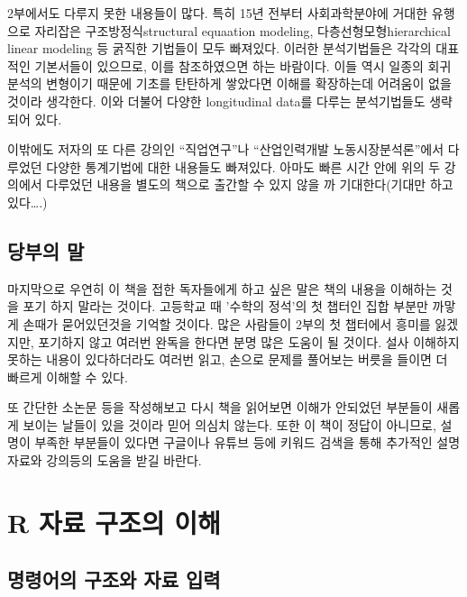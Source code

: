 \documentclass[
]{book}
\theoremstyle{definition}
\theoremstyle{definition}
\theoremstyle{definition}
\theoremstyle{definition}
\theoremstyle{remark}
\begin{document}
2부에서도 다루지 못한 내용들이 많다. 특히 15년 전부터 사회과학분야에 거대한 유행으로 자리잡은 구조방정식structural equaation modeling, 다층선형모형hierarchical linear modeling 등 굵직한 기법들이 모두 빠져있다. 이러한 분석기법들은 각각의 대표적인 기본서들이 있으므로, 이를 참조하였으면 하는 바람이다. 이들 역시 일종의 회귀분석의 변형이기 때문에 기초를 탄탄하게 쌓았다면 이해를 확장하는데 어려움이 없을 것이라 생각한다. 이와 더불어 다양한 longitudinal data를 다루는 분석기법들도 생략되어 있다.

이밖에도 저자의 또 다른 강의인 ``직업연구''나 ``산업인력개발 노동시장분석론''에서 다루었던 다양한 통계기법에 대한 내용들도 빠져있다. 아마도 빠른 시간 안에 위의 두 강의에서 다루었던 내용을 별도의 책으로 출간할 수 있지 않을 까 기대한다(기대만 하고 있다\ldots.)

\hypertarget{uxb2f9uxbd80uxc758-uxb9d0}{%
\section{당부의 말}\label{uxb2f9uxbd80uxc758-uxb9d0}}

마지막으로 우연히 이 책을 접한 독자들에게 하고 싶은 말은 책의 내용을 이해하는 것을 포기 하지 말라는 것이다. 고등학교 때 '수학의 정석'의 첫 챕터인 집합 부분만 까맣게 손때가 묻어있던것을 기억할 것이다. 많은 사람들이 2부의 첫 챕터에서 흥미를 잃겠지만, 포기하지 않고 여러번 완독을 한다면 분명 많은 도움이 될 것이다. 설사 이해하지 못하는 내용이 있다하더라도 여러번 읽고, 손으로 문제를 풀어보는 버릇을 들이면 더 빠르게 이해할 수 있다.

또 간단한 소논문 등을 작성해보고 다시 책을 읽어보면 이해가 안되었던 부분들이 새롭게 보이는 날들이 있을 것이라 믿어 의심치 않는다. 또한 이 책이 정답이 아니므로, 설명이 부족한 부분들이 있다면 구글이나 유튜브 등에 키워드 검색을 통해 추가적인 설명자료와 강의등의 도움을 받길 바란다.

\hypertarget{data}{%
\chapter{R 자료 구조의 이해}\label{data}}

\hypertarget{uxba85uxb839uxc5b4uxc758-uxad6cuxc870uxc640-uxc790uxb8cc-uxc785uxb825}{%
\section{명령어의 구조와 자료 입력}\label{uxba85uxb839uxc5b4uxc758-uxad6cuxc870uxc640-uxc790uxb8cc-uxc785uxb825}}
\end{document}
